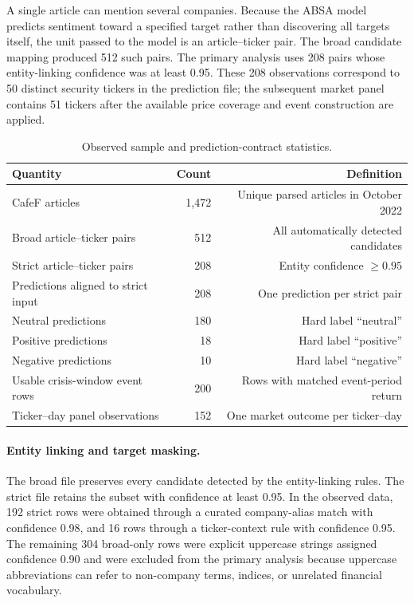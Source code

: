 A single article can mention several companies. Because the ABSA model predicts sentiment toward a specified target rather than discovering all targets itself, the unit passed to the model is an article--ticker pair. The broad candidate mapping produced 512 such pairs. The primary analysis uses 208 pairs whose entity-linking confidence was at least 0.95. These 208 observations correspond to 50 distinct security tickers in the prediction file; the subsequent market panel contains 51 tickers after the available price coverage and event construction are applied.

\begin{table}[htbp]
\centering
\caption{Observed sample and prediction-contract statistics.}
\label{tab:validation_sample}
\begin{tabular}{lrr}
\toprule
\textbf{Quantity} & \textbf{Count} & \textbf{Definition} \\
\midrule
CafeF articles & 1,472 & Unique parsed articles in October 2022 \\
Broad article--ticker pairs & 512 & All automatically detected candidates \\
Strict article--ticker pairs & 208 & Entity confidence $\geq 0.95$ \\
Predictions aligned to strict input & 208 & One prediction per strict pair \\
Neutral predictions & 180 & Hard label ``neutral'' \\
Positive predictions & 18 & Hard label ``positive'' \\
Negative predictions & 10 & Hard label ``negative'' \\
Usable crisis-window event rows & 200 & Rows with matched event-period return \\
Ticker--day panel observations & 152 & One market outcome per ticker--day \\
\bottomrule
\end{tabular}
\end{table}

\paragraph{Entity linking and target masking.}
The broad file preserves every candidate detected by the entity-linking rules. The strict file retains the subset with confidence at least 0.95. In the observed data, 192 strict rows were obtained through a curated company-alias match with confidence 0.98, and 16 rows through a ticker-context rule with confidence 0.95. The remaining 304 broad-only rows were explicit uppercase strings assigned confidence 0.90 and were excluded from the primary analysis because uppercase abbreviations can refer to non-company terms, indices, or unrelated financial vocabulary.

